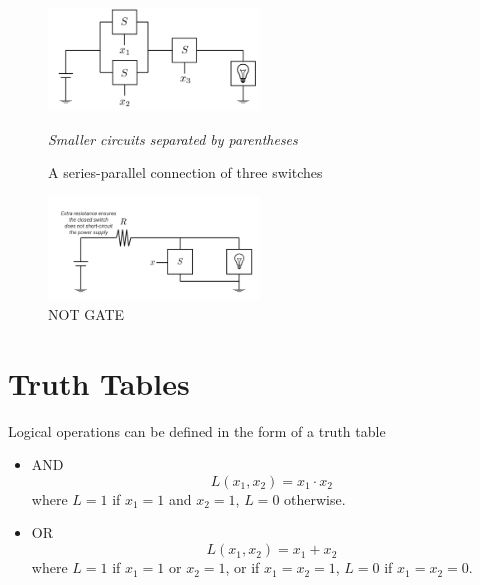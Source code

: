 \documentclass[12pt,openany, tikz,border=10pt]{book}
\begin{document}
\begin{figure}[htp] %
    \centering
    \includegraphics[width=0.5\textwidth]{circuits/6.1.3_3.png} %
    \caption{A series-parallel connection of three switches}
     \newline
    \textit{Smaller circuits separated by parentheses}
  \end{figure}


  \begin{figure}[htp]
    \centering
    \includegraphics[width=0.5\textwidth]{circuits/6.1.3_4.png} %
    \caption{NOT GATE} %
    \label{fig:notgate} %
    \medskip %
  \end{figure}
  \newpage
  \section{Truth Tables}
  Logical operations can be defined in the form of a truth table
  \begin{itemize}
      \item[] AND
      \begin{equation*}
          L(x_1, x_2) = x_1 \cdot x_2
      \end{equation*}
      where \( L = 1 \) if \( x_1 = 1 \) and \( x_2 = 1 \), \( L = 0 \) otherwise.
      
      \item[] OR
      \begin{equation*}
          L(x_1, x_2) = x_1 + x_2
      \end{equation*}
      where \( L = 1 \) if \( x_1 = 1 \) or \( x_2 = 1 \), or if \( x_1 = x_2 = 1 \), \( L = 0 \) if \( x_1 = x_2 = 0 \).
  \end{itemize}
  
\end{document}
